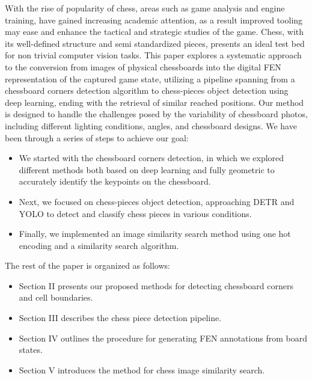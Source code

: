 With the rise of popularity of chess, areas such as game analysis and engine training, 
have gained increasing academic attention, as a result improved tooling may ease and enhance the tactical and strategic studies of the game.
Chess, with its well-defined structure and semi standardized pieces, presents an ideal 
test bed for non trivial computer vision tasks. \newline
This paper explores a systematic approach to the conversion from images of physical chessboards into the digital FEN representation of the captured game state, 
utilizing a pipeline spanning from a chessboard corners detection algorithm to chess-pieces object detection 
using deep learning, ending with the retrieval of similar reached positions. \newline
Our method is designed to handle the challenges posed by the variability of chessboard photos, including different lighting conditions, angles, and chessboard designs.
\newline
We have been through a series of steps to achieve our goal:
\begin{itemize}
    \item We started with the chessboard corners detection, in which we explored different methods both based on deep learning and fully geometric to accurately identify the keypoints on the chessboard.
    \item Next, we focused on chess-pieces object detection, approaching DETR and YOLO to detect and classify chess pieces in various conditions.
    \item Finally, we implemented an image similarity search method using one hot encoding and a similarity search algorithm.
\end{itemize}

The rest of the paper is organized as follows: 
\begin{itemize}
    \item Section II presents our proposed methods for detecting chessboard corners and cell boundaries.
    \item Section III describes the chess piece detection pipeline.
    \item Section IV outlines the procedure for generating FEN annotations from board states.
    \item Section V introduces the method for chess image similarity search.
\end{itemize}